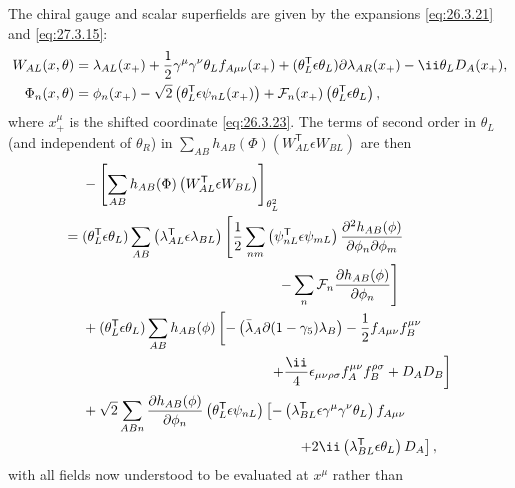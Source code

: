 The chiral gauge and scalar superfields are given by the expansions
\eqref{eq:26.3.21} and \eqref{eq:27.3.15}:
\[
  \begin{aligned}
  W_{AL}(x,\theta)={}&
  \lambda_{AL}(x_+)
  +\frac12\gamma^\mu\gamma^\nu\theta_Lf_{A\mu\nu}(x_+)
  +(\theta_L^{\mathsf T}\epsilon\theta_L)
    \sl{\partial}\lambda_{AR}(x_+)
  -\ii\theta_LD_A(x_+),
  \\
  \Phi_n(x,\theta)={}&
  \phi_n(x_+)
  -\sqrt{2}\left(\theta_L^{\mathsf T}\epsilon\psi_{nL}(x_+)\right)
  +\mathcal{F}_n(x_+)
    \left(\theta_L^{\mathsf T}\epsilon\theta_L\right),
  \end{aligned}
\]
where \(x_+^\mu\) is the shifted coordinate \eqref{eq:26.3.23}. The terms of
second order in \(\theta_L\) (and independent of \(\theta_R\)) in
\(\sum_{AB}h_{AB}(\Phi)(W_{AL}^{\mathsf T}\epsilon W_{BL})\) are then
\[
  \begin{aligned}
  &-\left[
    \sum_{AB}h_{AB}(\Phi)
    \left(W_{AL}^{\mathsf T}\epsilon W_{BL}\right)
  \right]_{\theta_L^2}
  \\
  ={}&
  (\theta_L^{\mathsf T}\epsilon\theta_L)
  \sum_{AB}\left(\lambda_{AL}^{\mathsf T}\epsilon\lambda_{BL}\right)
  \left[
    \frac12\sum_{nm}
      \left(\psi_{nL}^{\mathsf T}\epsilon\psi_{mL}\right)
      \frac{\partial^2h_{AB}(\phi)}
           {\partial\phi_n\partial\phi_m}
  \right.
  \\
  &\hspace{49mm}\left.
    -\sum_n\mathcal{F}_n
      \frac{\partial h_{AB}(\phi)}{\partial\phi_n}
  \right]
  \\
  &+(\theta_L^{\mathsf T}\epsilon\theta_L)
  \sum_{AB}h_{AB}(\phi)
  \left[
    -\left(\bar\lambda_A\sl{\partial}
      (1-\gamma_5)\lambda_B\right)
    -\frac12f_{A\mu\nu}f_B^{\mu\nu}
  \right.
  \\
  &\hspace{47mm}\left.
    +\frac{\ii}{4}\epsilon_{\mu\nu\rho\sigma}
      f_A^{\mu\nu}f_B^{\rho\sigma}
    +D_AD_B
  \right]
  \\
  &+\sqrt{2}\sum_{ABn}
  \frac{\partial h_{AB}(\phi)}{\partial\phi_n}
  \left(\theta_L^{\mathsf T}\epsilon\psi_{nL}\right)
  \left[
    -\left(\lambda_{BL}^{\mathsf T}
      \epsilon\gamma^\mu\gamma^\nu\theta_L\right)f_{A\mu\nu}
  \right.
  \\
  &\hspace{54mm}\left.
    +2\ii\left(\lambda_{BL}^{\mathsf T}\epsilon\theta_L\right)D_A
  \right],
  \end{aligned}
\]
with all fields now understood to be evaluated at \(x^\mu\) rather than
